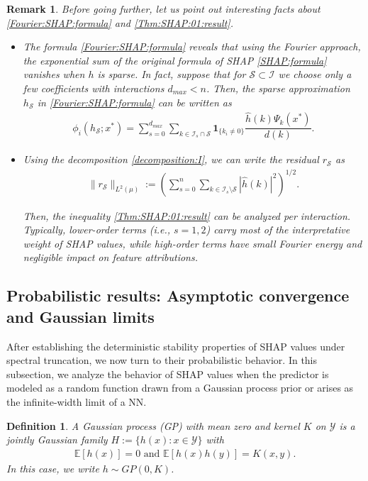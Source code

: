 \documentclass[letterpaper,11pt]{article}
\numberwithin{equation}{section}
\newtheorem{definition}[theorem]{Definition}
\newtheorem{remark}[theorem]{Remark}
\numberwithin{equation}{section}
\begin{document}
\begin{remark}
    Before going further, let us point out interesting facts about \eqref{Fourier:SHAP:formula} and \eqref{Thm:SHAP:01:result}.
    \begin{itemize}
    \item The formula \eqref{Fourier:SHAP:formula} reveals that using the Fourier approach, the exponential sum of the original formula of SHAP \eqref{SHAP:formula} vanishes when $h$ is sparse. In fact, suppose that for $\mathcal{S}\subset \mathcal{I}$ we choose only a few coefficients with interactions $d_{max}<n$. Then, the sparse approximation $h_{\mathcal{S}}$ in  \eqref{Fourier:SHAP:formula} can be written as 
    \begin{align*}
        \phi_i(h_{\mathcal{S}};x^*)=\sum_{s=0}^{d_{max}} \sum_{k\in \mathcal{I}_s \cap\mathcal{S} } \bm{1}_{\{k_i \neq 0\}} \dfrac{\hat{h}(k) \Psi_k(x^*)}{d(k)}.
    \end{align*}
    \item Using the decomposition \eqref{decomposition:I}, we can write the residual $r_{\mathcal{S}}$ as 
    \begin{align*}
        \|r_{\mathcal{S}}\|_{L^2(\mu)}:= \left(\sum_{s=0}^{n} \sum_{k\in \mathcal{I}_s\setminus \mathcal{S} } |\hat{h}(k)|^2\right)^{1/2}.
    \end{align*}

    Then, the inequality \eqref{Thm:SHAP:01:result} can be analyzed per interaction. Typically, lower-order terms (i.e., $s=1,2$) carry most of the interpretative weight of SHAP values, while high-order terms have small Fourier energy and negligible impact on feature attributions.
    \end{itemize}
\end{remark}

\subsection{Probabilistic results: Asymptotic convergence and Gaussian limits}

After establishing the deterministic stability properties of SHAP values under spectral truncation, we now turn to their probabilistic behavior. In this subsection, we analyze the behavior of SHAP values when the predictor is modeled as a random function drawn from a Gaussian process prior or arises as the infinite-width limit of a NN. 
\begin{definition} 
A Gaussian process (GP) with mean zero and kernel $K$ on $\mathcal{Y}$ is a jointly Gaussian family $H:=\{h(x):x\in \mathcal{Y}\}$ with 
\begin{align*}
    \mathbb{E}[h(x)]=0\text{ and } \mathbb{E}[h(x)h(y)]=K(x,y).
\end{align*}
In this case, we write $h\sim GP(0,K)$.
\end{definition}
\end{document}
